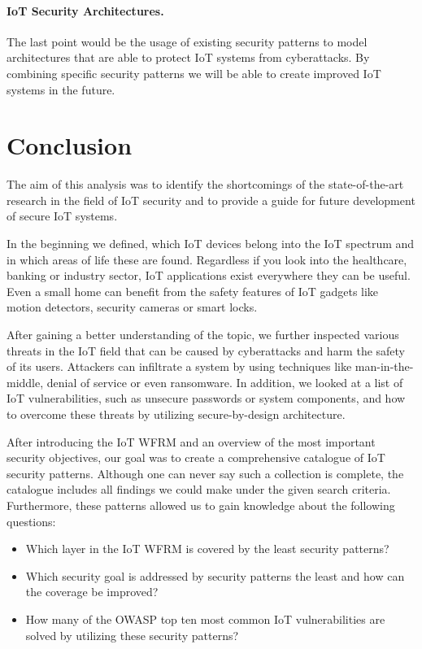 \paragraph{\textbf{IoT Security Architectures.}} The last point would be the usage of existing security patterns to model architectures that are able to protect IoT systems from cyberattacks. By combining specific security patterns we will be able to create improved IoT systems in the future. 


\section{Conclusion}\label{sec:conclusion}
The aim of this analysis was to identify the shortcomings of the state-of-the-art research in the field of IoT security and to provide a guide for future development of secure IoT systems. 

In the beginning we defined, which IoT devices belong into the IoT spectrum and in which areas of life these are found. Regardless if you look into the healthcare, banking or industry sector, IoT applications exist everywhere they can be useful. Even a small home can benefit from the safety features of IoT gadgets like motion detectors, security cameras or smart locks.

After gaining a better understanding of the topic, we further inspected various threats in the IoT field that can be caused by cyberattacks and harm the safety of its users. Attackers can infiltrate a system by using techniques like man-in-the-middle, denial of service or even ransomware. In addition, we looked at a list of IoT vulnerabilities, such as unsecure passwords or system components, and how to overcome these threats by utilizing secure-by-design architecture.  

After introducing the IoT WFRM and an overview of the most important security objectives, our goal was to create a comprehensive catalogue of IoT security patterns. Although one can never say such a collection is complete, the catalogue includes all findings we could make under the given search criteria. Furthermore, these patterns allowed us to gain knowledge about the following questions:

\begin{itemize}
	\item Which layer in the IoT WFRM is covered by the least security patterns?
	\item Which security goal is addressed by security patterns the least and how can the coverage be improved?
	\item How many of the OWASP top ten most common IoT vulnerabilities are solved by utilizing these security patterns?
\end{itemize}

